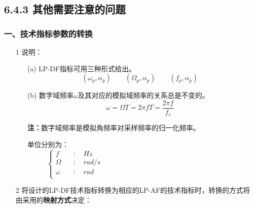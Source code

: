 \documentclass[notheorems,compress,mathserif,table]{beamer}
\begin{document}
\subsection{6.4.3 其他需要注意的问题}
\begin{frame}[shrink]\frametitle{一、技术指标参数的转换}%

\begin{enumerate}
  \item [1] 说明：

      \begin{enumerate}
        \item [(a)] LP-DF指标可用三种形式给出。
              $$(\omega_p,\alpha_p)\quad\quad(\Omega_p,\alpha_p)
              \quad\quad(f_p,\alpha_p)$$
        \item [(b)] 数字域频率$\omega$及其对应的模拟域频率的关系总是不变的。
              $$\omega = \Omega T = 2\pi f T = \frac{2\pi f}{f_s}$$
        \par \textbf{注：}数字域频率是模拟角频率对采样频率的归一化频率。\par
              单位分别为：
              $$
              \left\{ \begin{aligned}
                f      &\quad  :\quad Hz\quad\quad\quad\quad\quad\quad\quad\quad
                \quad\quad\quad\quad\quad\quad\quad\quad\quad\quad\quad\quad\\
                \Omega &\quad :\quad rad/s \\
                \omega &\quad :\quad rad\\
              \end{aligned} \right.
              $$
              \end{enumerate}

  \item [2] 将设计的LP-DF技术指标转换为相应的LP-AF的技术指标时，转换的方式将由采用的\textbf{映射方式}决定：

\end{enumerate}
\end{frame}
\end{document}
